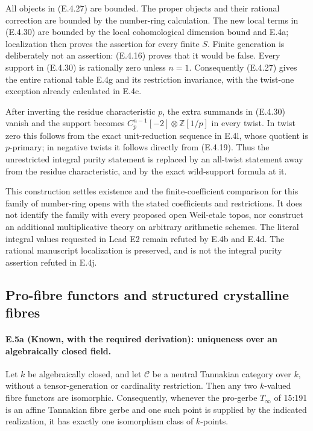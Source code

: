 All objects in (E.4.27) are bounded. The proper objects and
their rational correction are bounded by the number-ring
calculation. The new local terms in (E.4.30) are bounded by
the local cohomological dimension bound and E.4a; localization
then proves the assertion for every finite $S$.
Finite generation is deliberately not an assertion:
(E.4.16) proves that it would be false.
Every support in (E.4.30) is rationally zero unless $n=1$.
Consequently (E.4.27) gives the entire rational table E.4g
and its restriction invariance, with the twist-one exception
already calculated in E.4c.

After inverting the residue characteristic $p$, the extra
summands in (E.4.30) vanish and the support becomes
$C_p^{n-1}[-2]\otimes\mathbb Z[1/p]$ in every twist.
In twist zero this follows from the exact unit-reduction
sequence in E.4l, whose quotient is $p$-primary; in negative
twists it follows directly from (E.4.19).
Thus the unrestricted integral purity statement is replaced
by an all-twist statement away from the residue
characteristic, and by the exact wild-support formula at it.

This construction settles existence and the finite-coefficient
comparison for this family of number-ring opens with the
stated coefficients and restrictions. It does not identify
the family with every proposed open Weil-etale topos, nor
construct an additional multiplicative theory on arbitrary
arithmetic schemes. The literal integral values requested in
Lead E2 remain refuted by E.4b and E.4d. The rational
manuscript localization is preserved, and is not the
integral purity assertion refuted in E.4j.


\subsection{Pro-fibre functors and structured crystalline fibres}
\label{sec:real-weil-E5}

\paragraph{E.5a (Known, with the required derivation): uniqueness over an algebraically closed field.}
Let $k$ be algebraically closed, and let $\mathcal C$ be a neutral
Tannakian category over $k$, without a tensor-generation or cardinality
restriction. Then any two $k$-valued fibre functors are isomorphic.
Consequently, whenever the pro-gerbe $T_\infty$ of 15:191 is an affine
Tannakian fibre gerbe and one such point is supplied by the indicated
realization, it has exactly one isomorphism class of $k$-points.

